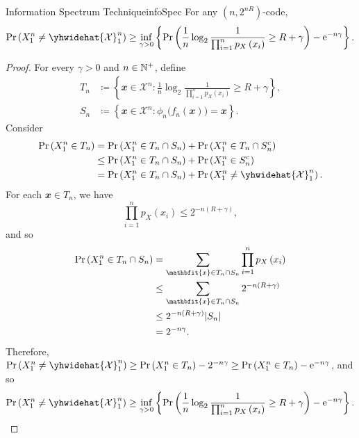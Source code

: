 \documentclass[math, code]{amznotes}
\theoremstyle{remark}
\newcommand{\e}{\mathrm{e}}
\begin{document}
\begin{lembox}{Information Spectrum Technique}{infoSpec}
    For any $\left(n, 2^{nR}\right)$-code, 
    \begin{equation*}
        \Pr\left(X_1^n \neq \yhwidehat{\mathcal{X}}_1^n\right) \geq \inf_{\gamma > 0}\left\{\Pr\left(\frac{1}{n}\log_2\frac{1}{\prod_{i = 1}^np_X\left(x_i\right)} \geq R + \gamma\right) - \e^{-n\gamma}\right\}.
    \end{equation*}
    \tcblower
    \begin{proof}
        For every $\gamma > 0$ and $n \in \mathbb{N}^+$, define 
        \begin{align*}
            T_n & \coloneqq \left\{\mathbfit{x} \in \mathcal{X}^n \colon \frac{1}{n}\log_2\frac{1}{\prod_{i = 1}^np_X\left(x_i\right)} \geq R + \gamma\right\}, \\
            S_n & \coloneqq \left\{\mathbfit{x} \in \mathcal{X}^n \colon \phi_n\bigl(f_n\left(\mathbfit{x}\right)\bigr) = \mathbfit{x}\right\}.
        \end{align*}
        Consider 
        \begin{align*}
            \Pr\left(X_1^n \in T_n\right) & = \Pr\left(X_1^n \in T_n \cap S_n\right) + \Pr\left(X_1^n \in T_n \cap S_n^c\right) \\
            & \leq \Pr\left(X_1^n \in T_n \cap S_n\right) + \Pr\left(X_1^n \in S_n^c\right) \\
            & = \Pr\left(X_1^n \in T_n \cap S_n\right) + \Pr\left(X_1^n \neq \yhwidehat{\mathcal{X}}_1^n\right).
        \end{align*}
        For each $\mathbfit{x} \in T_n$, we have 
        \begin{equation*}
            \prod_{i = 1}^{n}p_X\left(x_i\right) \leq 2^{-n\left(R + \gamma\right)},
        \end{equation*}
        and so 
        \begin{align*}
            \Pr\left(X_1^n \in T_n \cap S_n\right) & = \sum_{\mathbfit{x} \in T_n \cap S_n}\prod_{i = 1}^{n}p_X\left(x_i\right) \\
            & \leq \sum_{\mathbfit{x} \in T_n \cap S_n}2^{-n\left(R + \gamma\right)} \\
            & \leq 2^{-n\left(R + \gamma\right)}\abs{S_n} \\
            & = 2^{-n\gamma}.
        \end{align*}
        Therefore, $\Pr\left(X_1^n \neq \yhwidehat{\mathcal{X}}_1^n\right) \geq \Pr\left(X_1^n \in T_n\right) - 2^{-n\gamma} \geq \Pr\left(X_1^n \in T_n\right) - \e^{-n\gamma}$, and so 
        \begin{equation*}
            \Pr\left(X_1^n \neq \yhwidehat{\mathcal{X}}_1^n\right) \geq \inf_{\gamma > 0}\left\{\Pr\left(\frac{1}{n}\log_2\frac{1}{\prod_{i = 1}^np_X\left(x_i\right)} \geq R + \gamma\right) - \e^{-n\gamma}\right\}.
        \end{equation*}
    \end{proof}
\end{lembox}
\end{document}
